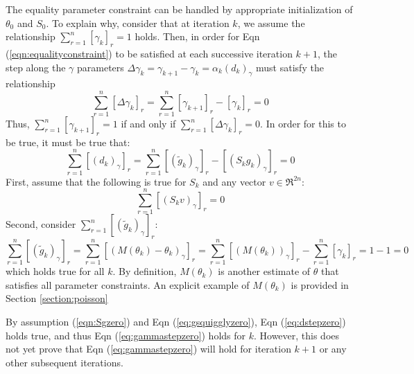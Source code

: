 \documentclass[letter,12pt]{article}
\begin{document}
The equality parameter constraint can be handled by appropriate initialization of $\theta_0$ and $S_0$.  To explain why, consider that at iteration $k$, we assume the relationship $\sum_{r=1}^{n}[\gamma_{k}]_r=1$ holds.  Then, in order for Eqn (\ref{eqn:equalityconstraint}) to be satisfied at each successive iteration $k+1$, the step along the $\gamma$ parameters $\Delta \gamma_k = \gamma_{k+1} - \gamma_k = \alpha_k(d_k)_{\gamma}$ must satisfy the relationship
\begin{equation} \label{eq:gammastepzero}
\sum_{r=1}^{n} [\Delta \gamma_k]_r
=
\sum_{r=1}^{n}[\gamma_{k+1}]_r - [\gamma_k]_r
= 0
\end{equation}
Thus, $\sum_{r=1}^{n}[\gamma_{k+1}]_r=1$ if and only if $\sum_{r=1}^{n} [\Delta \gamma_k]_r = 0$.  In order for this to be true, it must be true that:
\begin{equation} \label{eq:dstepzero}
\sum_{r=1}^{n} [(d_k)_{\gamma}]_r
=
\sum_{r=1}^{n} [(\tilde{g}_k)_{\gamma}]_r - [(S_kg_k)_{\gamma}]_r = 0
\end{equation}
First, assume that the following is true for $S_{k}$ and any vector $v \in \Re^{2n}$:
\begin{equation} \label{eqn:Sgzero}
\sum_{r=1}^{n} [(S_{k}v)_{\gamma}]_r = 0
\end{equation}
Second, consider $\sum_{r=1}^{n} [(\tilde{g}_k)_{\gamma}]_r$:
\begin{equation} \label{eq:gsquigglyzero}
\sum_{r=1}^{n} [(\tilde{g}_k)_{\gamma}]_r
=
\sum_{r=1}^{n} [(M(\theta_k) - \theta_k)_{\gamma}]_r
=
\sum_{r=1}^{n} [(M(\theta_k))_{\gamma}]_r - \sum_{r=1}^{n} [\gamma_k]_r = 1 - 1 = 0
\end{equation}
which holds true for all $k$.  By definition, $M(\theta_k)$ is another estimate of $\theta$ that satisfies all parameter constraints.  An explicit example of $M(\theta_k)$ is provided in Section \ref{section:poisson}

By assumption (\ref{eqn:Sgzero}) and Eqn (\ref{eq:gsquigglyzero}), Eqn (\ref{eq:dstepzero}) holds true, and thus Eqn (\ref{eq:gammastepzero}) holds for $k$.  However, this does not yet prove that Eqn (\ref{eq:gammastepzero}) will hold for iteration $k+1$ or any other subsequent iterations.  
\end{document}
